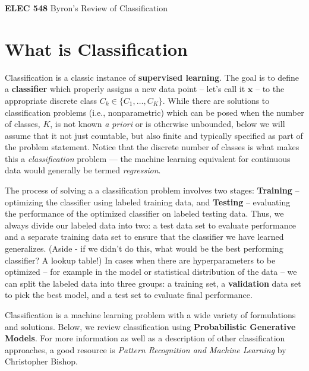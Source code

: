 \documentclass[11pt]{article}
\newcommand{\xb}{\mathbf{x}}
\begin{document}
\setmainfont{Myriad Pro} %

\begin{center}
\large
\textbf{ELEC 548} Byron's Review of Classification
\end{center}

\section{What is Classification}
Classification is a classic instance of \textbf{supervised learning}. The goal is to define a \textbf{classifier} which properly assigns a new data point -- let's call it $\xb$ -- to the appropriate discrete class $C_k \in \lbrace C_1, \ldots, C_K \rbrace$. While there are solutions to classification problems (i.e., nonparametric) which can be posed when the number of classes, $K$, is not known \textit{a priori} or is otherwise unbounded, below we will assume that it not just countable, but also  finite and typically specified as part of the problem statement. Notice that the discrete number of classes is what makes this a \textit{classification} problem --- the machine learning equivalent for continuous data would generally be termed \textit{regression}.

The process of solving a a classification problem involves two stages: \textbf{Training}  -- optimizing the classifier using labeled training data, and \textbf{Testing} -- evaluating  the performance of the optimized classifier on labeled testing data. Thus, we always divide our labeled data into two: a test data set to evaluate performance and a separate training  data set to ensure that the classifier we have learned generalizes. (Aside - if we didn't do this, what would be the best performing classifier? A lookup table!)  In cases when there are hyperparameters to be optimized -- for example in the model or statistical distribution of the data -- we can split the labeled data into three groups: a training set, a \textbf{validation} data set to pick the best model, and a test set to evaluate final performance.

Classification is a machine learning problem with a wide variety of formulations and solutions. Below, we review classification using \textbf{Probabilistic Generative Models}. For more information as well as a description of other classification approaches, a good resource is \textit{Pattern Recognition and Machine Learning} by Christopher Bishop.
\end{document}
